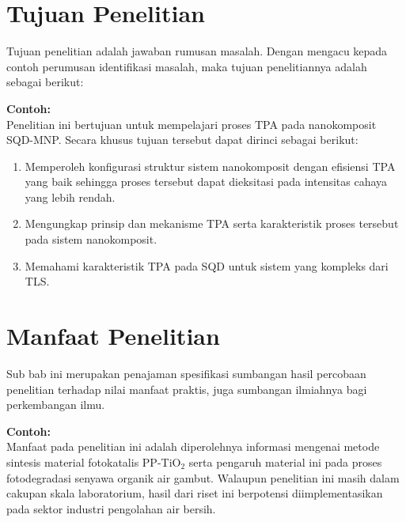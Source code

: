 \section{Tujuan Penelitian}
Tujuan penelitian adalah jawaban rumusan masalah. Dengan mengacu kepada contoh perumusan identifikasi masalah, maka tujuan penelitiannya adalah sebagai berikut:

\textbf{Contoh:} \\
Penelitian ini bertujuan untuk mempelajari proses TPA pada nanokomposit SQD-MNP. Secara khusus tujuan tersebut dapat dirinci sebagai berikut:
\begin{enumerate}
    \item Memperoleh konfigurasi struktur sistem nanokomposit dengan efisiensi TPA yang baik sehingga proses tersebut dapat dieksitasi pada intensitas cahaya yang lebih rendah.
    \item Mengungkap prinsip dan mekanisme TPA serta karakteristik proses tersebut pada sistem nanokomposit.
    \item Memahami karakteristik TPA pada SQD untuk sistem yang kompleks dari TLS.
\end{enumerate}

\section{Manfaat Penelitian}
Sub bab ini merupakan penajaman spesifikasi sumbangan hasil percobaan penelitian terhadap nilai manfaat praktis, juga sumbangan ilmiahnya bagi perkembangan ilmu.

\textbf{Contoh:} \\
Manfaat pada penelitian ini adalah diperolehnya informasi mengenai metode sintesis material fotokatalis PP-TiO$_2$ serta pengaruh material ini pada proses fotodegradasi senyawa organik air gambut. Walaupun penelitian ini masih dalam cakupan skala laboratorium, hasil dari riset ini berpotensi diimplementasikan pada sektor industri pengolahan air bersih.
